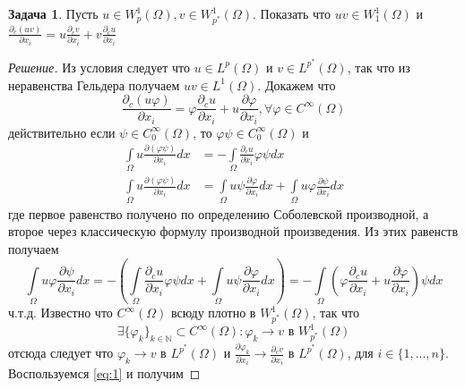 \documentclass[12pt,a4paper]{article}
\theoremstyle{definition}
\newtheorem{exercise}{Задача}
\newenvironment{solution}
{\renewcommand\qedsymbol{$\blacksquare$}\begin{proof}[Решение]}
{\end{proof}}
\newcommand{\Natural}{\mathbb{N}}
\begin{document}
\addtocounter{exercise}{4}

\begin{exercise}\label{exr:1}
	Пусть $u \in W_p^1 (\Omega), v \in W_{p^*}^1 (\Omega)$. Показать что $uv \in W_1^1 (\Omega)$ и \\ $\frac{\partial_c (uv)}{\partial x_i} = u\frac{\partial_c v}{\partial x_i} + v\frac{\partial_c u}{\partial x_i}$
\end{exercise}
\begin{solution}
	Из условия следует что $u \in L^p (\Omega)$ и $v \in L^{p^*} (\Omega)$, так что из неравенства Гельдера получаем $uv \in L^1 (\Omega)$. Докажем что 
	\begin{equation}\label{eq:1}
		\frac{\partial_c (u\varphi)}{\partial x_i} = \varphi \frac{\partial_c u}{\partial x_i} + u \frac{\partial \varphi}{\partial x_i}, \forall \varphi \in C^\infty (\Omega)
	\end{equation}
	действительно если $\psi \in C_0^\infty (\Omega)$, то $\varphi \psi \in C_0^\infty (\Omega)$ и 
	\begin{align*}
		\int\limits_{\Omega}{u \frac{\partial (\varphi \psi)}{\partial x_i} dx} &= -\int\limits_{\Omega}{\frac{\partial_c u}{\partial x_i} \varphi \psi dx} \\
		\int\limits_{\Omega}{u \frac{\partial (\varphi \psi)}{\partial x_i} dx} &= \int\limits_{\Omega}{u \psi \frac{\partial \varphi }{\partial x_i} dx} + \int\limits_{\Omega}{u \varphi \frac{\partial \psi}{\partial x_i} dx}
	\end{align*}
	где первое равенство получено по определению Соболевской производной, а второе через классическую формулу производной произведения. Из этих равенств получаем
	\begin{equation*}
		\int\limits_{\Omega}{u \varphi \frac{\partial \psi}{\partial x_i} dx} = - \left( \int\limits_{\Omega}{\frac{\partial_c u}{\partial x_i} \varphi \psi dx} + \int\limits_{\Omega}{u \psi \frac{\partial \varphi }{\partial x_i} dx} \right) = -\int\limits_{\Omega}{\left( \varphi \frac{\partial_c u}{\partial x_i} + u \frac{\partial \varphi}{\partial x_i} \right) \psi dx}
	\end{equation*} 
	ч.т.д.
	Известно что $C^\infty (\Omega)$ всюду плотно в $W_{p^*}^1 (\Omega)$, так что 
	\begin{equation*}
		\exists \{\varphi_k\}_{k\in\Natural} \subset C^\infty (\Omega): \varphi_k \to v \text{ в } W_{p^*}^1 (\Omega)
	\end{equation*}
	отсюда следует что $\varphi_k \to v$ в $L^{p^*} (\Omega)$ и $\frac{\partial \varphi_k}{\partial x_i} \to \frac{\partial_c v}{\partial x_i}$ в $L^{p^*} (\Omega)$, для $i \in \{1, ..., n\}$. Воспользуемся \eqref{eq:1} и получим

\end{solution}
\end{document}
